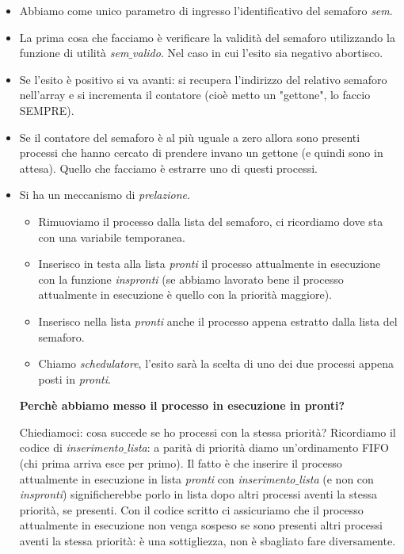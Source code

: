 \begin{itemize}
	\item Abbiamo come unico parametro di ingresso l'identificativo del semaforo \emph{sem}.
	\item La prima cosa che facciamo è verificare la validità del semaforo utilizzando la funzione di utilità \emph{sem$\_$valido}. Nel caso in cui l'esito sia negativo abortisco.
	\item Se l'esito è positivo si va avanti: si recupera l'indirizzo del relativo semaforo nell'array e si  incrementa il contatore (cioè metto un "gettone", lo faccio SEMPRE).
	\item Se il contatore del semaforo è al più uguale a zero allora sono presenti processi che hanno cercato di prendere invano un gettone (e quindi sono in attesa). Quello che facciamo è estrarre uno di questi processi. \item Si ha un meccanismo di \emph{prelazione}.
	\begin{itemize}
		\item Rimuoviamo il processo dalla lista del semaforo, ci ricordiamo dove sta con una variabile temporanea.
		\item Inserisco in testa alla lista \textit{pronti} il processo attualmente in esecuzione con la funzione  \emph{inspronti} (se abbiamo lavorato bene il processo attualmente in esecuzione è quello con la priorità maggiore).
		\item Inserisco nella lista \textit{pronti} anche il processo appena estratto dalla lista del semaforo. 
		\item Chiamo  \textit{schedulatore}, l'esito sarà la scelta di uno dei due processi appena posti in \textit{pronti}.
	\end{itemize}
	\textbf{Perchè abbiamo messo il processo in esecuzione in pronti?} 
	
	Chiediamoci: cosa succede se ho processi con la stessa priorità? Ricordiamo il codice di \emph{inserimento$\_$lista}: a parità di priorità diamo un'ordinamento FIFO (chi prima arriva esce per primo). Il fatto è che inserire il processo attualmente in esecuzione in lista \emph{pronti} con \emph{inserimento$\_$lista} (e non con \emph{inspronti}) significherebbe porlo in lista dopo altri processi aventi la stessa priorità, se presenti. Con il codice scritto ci assicuriamo che il processo attualmente in esecuzione non venga sospeso se sono presenti altri processi aventi la stessa priorità: è una sottigliezza, non è sbagliato fare diversamente.
\end{itemize} 

